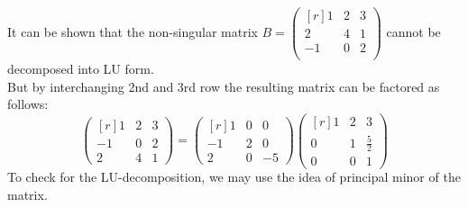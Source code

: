 \documentclass[12pt,class=book,crop=false]{standalone}
\begin{document}
It can be shown that the non-singular matrix $ B=\begin{pmatrix*}[r]
        1&2&3\\
        2&4&1\\
        -1&0&2\\
    \end{pmatrix*} $ cannot be decomposed into LU form.\\
But by interchanging 2nd and 3rd row the resulting matrix can be factored as follows:
\[
    \begin{pmatrix*}[r]
        1&2&3\\
        -1&0&2\\
        2&4&1
    \end{pmatrix*}=
    \begin{pmatrix*}[r]
        1 & 0 & 0\\
        -1 & 2 & 0\\
        2 & 0 & -5
    \end{pmatrix*}
    \begin{pmatrix*}[r]
        1 & 2 & 3\\
        0 & 1 & \frac{5}{2} \\
        0 & 0 & 1
    \end{pmatrix*}
\]
To check for the LU-decomposition, we may use the idea of principal minor of the matrix.
\end{document}
